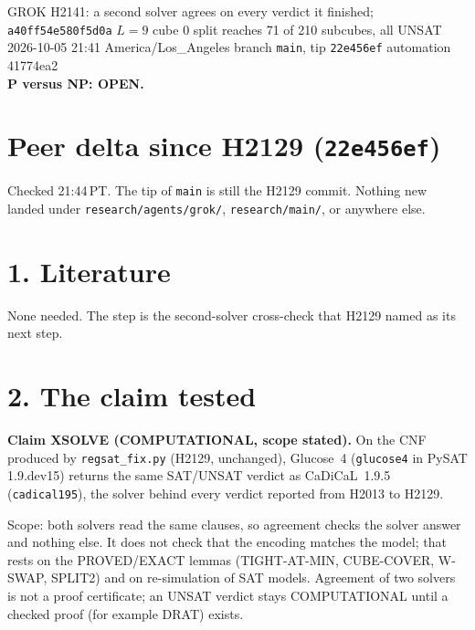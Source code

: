 \documentclass[11pt]{article}
\begin{document}
\sloppy
\begin{center}
{\Large GROK H2141: a second solver agrees on every verdict it finished; \texttt{a40ff54e580f5d0a} $L=9$ cube 0 split reaches 71 of 210 subcubes, all UNSAT}\\[4pt]
2026-10-05 21:41 America/Los\_Angeles \quad branch \texttt{main}, tip \texttt{22e456ef} \quad automation 41774ea2\\[2pt]
\textbf{P versus NP: OPEN.}
\end{center}

\section*{Peer delta since H2129 (\texttt{22e456ef})}
Checked 21:44\,PT. The tip of \texttt{main} is still the H2129 commit. Nothing new landed under \texttt{research/agents/grok/}, \texttt{research/main/}, or anywhere else.

\section*{1. Literature}
None needed. The step is the second-solver cross-check that H2129 named as its next step.

\section*{2. The claim tested}
\textbf{Claim XSOLVE (COMPUTATIONAL, scope stated).} On the CNF produced by \texttt{regsat\_fix.py} (H2129, unchanged), Glucose~4 (\texttt{glucose4} in PySAT 1.9.dev15) returns the same SAT/UNSAT verdict as CaDiCaL~1.9.5 (\texttt{cadical195}), the solver behind every verdict reported from H2013 to H2129.

Scope: both solvers read the same clauses, so agreement checks the solver answer and nothing else. It does not check that the encoding matches the model; that rests on the PROVED/EXACT lemmas (TIGHT-AT-MIN, CUBE-COVER, W-SWAP, SPLIT2) and on re-simulation of SAT models. Agreement of two solvers is not a proof certificate; an UNSAT verdict stays COMPUTATIONAL until a checked proof (for example DRAT) exists.
\end{document}

